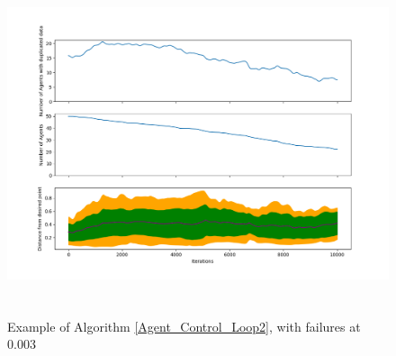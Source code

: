 \documentclass{UoYCSproject}
\begin{document}
\begin{figure}[htb]
\label{fig:Data11}
\begin{center}
\centering
\includegraphics[width=\linewidth, height=10cm]{"./Non_correlated_errors_test2_0.8_0.45.png"}
\caption{Example of Algorithm \ref{Agent_Control_Loop2}, with failures at 0.003}
\end{center}
\end{figure}
\end{document}
